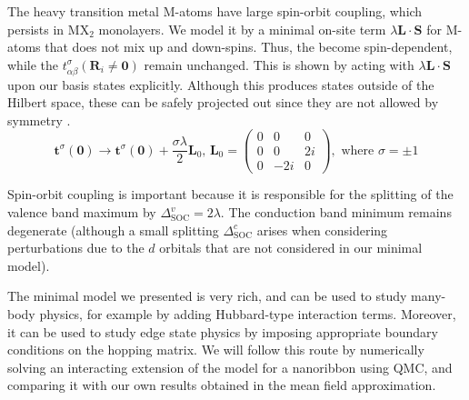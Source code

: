 The heavy transition metal $\text{M}$-atoms have large spin-orbit coupling, which persists in $\text{M}\text{X}_2$ monolayers.
We model it by a minimal on-site term $\lambda \bm L \cdot \bm S$ for $\text{M}$-atoms that does not mix up and down-spins.
Thus, the  become spin-dependent, while the $t_{\alpha \beta}^\sigma ( \bm R_i \neq \bm 0 ) $ remain unchanged.
This is shown by acting with $\lambda \bm L \cdot \bm S$ upon our basis states explicitly.
Although this produces states outside of the Hilbert space, these can be safely projected out since they are not allowed by symmetry \cite{liu_three-band_2013,braz_electronic_2015}.
\begin{equation}
\bm t^\sigma ( \bm 0 ) \rightarrow \bm t^\sigma ( \bm 0 ) + \frac{\sigma \lambda}{2} \bm L_0 , \, \bm L_0 =
\begin{pmatrix}
0 & 0 & 0 \\
0 & 0 & 2i \\
0 & -2i & 0 
\end{pmatrix}
, \,\, \text{where} \,\,  \sigma = \pm 1
\end{equation}

Spin-orbit coupling is important because it is responsible for the splitting of the valence band maximum by $\Delta_{\text{SOC}}^v = 2 \lambda$.
The conduction band minimum remains degenerate (although a small splitting $\Delta_{\text{SOC}}^c$ arises when considering perturbations due to the $d$ orbitals that are not considered in our minimal model).

The minimal model we presented is very rich, and can be used to study many-body physics, for example by adding Hubbard-type interaction terms.
Moreover, it can be used to study edge state physics by imposing appropriate boundary conditions on the hopping matrix.
We will follow this route by numerically solving  an interacting extension of the model for a nanoribbon using \ac{QMC}, and comparing it with our own results obtained in the mean field approximation.